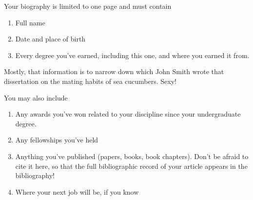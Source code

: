 Your biography is limited to one page and must contain

\begin{enumerate}
\def\labelenumi{\arabic{enumi}.}
\item
  Full name
\item
  Date and place of birth
\item
  Every degree you've earned, including this one, and where you earned
  it from.
\end{enumerate}

Mostly, that information is to narrow down which John Smith wrote that
dissertation on the mating habits of sea cucumbers. Sexy!

You may also include

\begin{enumerate}
\def\labelenumi{\arabic{enumi}.}
\item
  Any awards you've won related to your discipline since your
  undergraduate degree.
\item
  Any fellowships you've held
\item
  Anything you've published (papers, books, book chapters). Don't be
  afraid to cite it here, so that the full bibliographic record of your
  article appears in the bibliography!
\item
  Where your next job will be, if you know
\end{enumerate}
